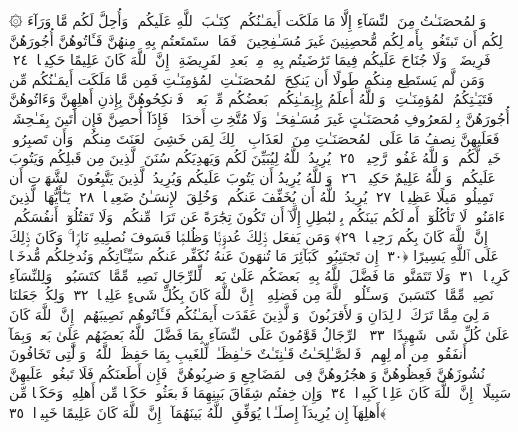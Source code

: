  ۞ وَٱلمُحصَنَـٰتُ مِنَ ٱلنِّسَآءِ إِلَّا مَا مَلَكَت أَيمَـٰنُكُم ۖ كِتَـٰبَ ٱللَّهِ عَلَيكُم ۚ وَأُحِلَّ لَكُم مَّا وَرَآءَ ذَٟلِكُم أَن تَبتَغُوا۟ بِأَموَٟلِكُم مُّحصِنِينَ غَيرَ مُسَـٰفِحِينَ ۚ فَمَا ٱستَمتَعتُم بِهِۦ مِنهُنَّ فَـَٔاتُوهُنَّ أُجُورَهُنَّ فَرِيضَةًۭ ۚ وَلَا جُنَاحَ عَلَيكُم فِيمَا تَرَٰضَيتُم بِهِۦ مِنۢ بَعدِ ٱلفَرِيضَةِ ۚ إِنَّ ٱللَّهَ كَانَ عَلِيمًا حَكِيمًۭا ﴿٢٤﴾
 وَمَن لَّم يَستَطِع مِنكُم طَولًا أَن يَنكِحَ ٱلمُحصَنَـٰتِ ٱلمُؤمِنَـٰتِ فَمِن مَّا مَلَكَت أَيمَـٰنُكُم مِّن فَتَيَـٰتِكُمُ ٱلمُؤمِنَـٰتِ ۚ وَٱللَّهُ أَعلَمُ بِإِيمَـٰنِكُم ۚ بَعضُكُم مِّنۢ بَعضٍۢ ۚ فَٱنكِحُوهُنَّ بِإِذنِ أَهلِهِنَّ وَءَاتُوهُنَّ أُجُورَهُنَّ بِٱلمَعرُوفِ مُحصَنَـٰتٍ غَيرَ مُسَـٰفِحَـٰتٍۢ وَلَا مُتَّخِذَٟتِ أَخدَانٍۢ ۚ فَإِذَآ أُحصِنَّ فَإِن أَتَينَ بِفَـٰحِشَةٍۢ فَعَلَيهِنَّ نِصفُ مَا عَلَى ٱلمُحصَنَـٰتِ مِنَ ٱلعَذَابِ ۚ ذَٟلِكَ لِمَن خَشِىَ ٱلعَنَتَ مِنكُم ۚ وَأَن تَصبِرُوا۟ خَيرٌۭ لَّكُم ۗ وَٱللَّهُ غَفُورٌۭ رَّحِيمٌۭ ﴿٢٥﴾
 يُرِيدُ ٱللَّهُ لِيُبَيِّنَ لَكُم وَيَهدِيَكُم سُنَنَ ٱلَّذِينَ مِن قَبلِكُم وَيَتُوبَ عَلَيكُم ۗ وَٱللَّهُ عَلِيمٌ حَكِيمٌۭ ﴿٢٦﴾
 وَٱللَّهُ يُرِيدُ أَن يَتُوبَ عَلَيكُم وَيُرِيدُ ٱلَّذِينَ يَتَّبِعُونَ ٱلشَّهَوَٟتِ أَن تَمِيلُوا۟ مَيلًا عَظِيمًۭا ﴿٢٧﴾
 يُرِيدُ ٱللَّهُ أَن يُخَفِّفَ عَنكُم ۚ وَخُلِقَ ٱلإِنسَـٰنُ ضَعِيفًۭا ﴿٢٨﴾
 يَـٰٓأَيُّهَا ٱلَّذِينَ ءَامَنُوا۟ لَا تَأكُلُوٓا۟ أَموَٟلَكُم بَينَكُم بِٱلبَٰطِلِ إِلَّآ أَن تَكُونَ تِجَٰرَةً عَن تَرَاضٍۢ مِّنكُم ۚ وَلَا تَقتُلُوٓا۟ أَنفُسَكُم ۚ إِنَّ ٱللَّهَ كَانَ بِكُم رَحِيمًۭا ﴿٢٩﴾
 وَمَن يَفعَل ذَٟلِكَ عُدوَٟنًۭا وَظُلمًۭا فَسَوفَ نُصلِيهِ نَارًۭا ۚ وَكَانَ ذَٟلِكَ عَلَى ٱللَّهِ يَسِيرًا ﴿٣٠﴾
 إِن تَجتَنِبُوا۟ كَبَآئِرَ مَا تُنهَونَ عَنهُ نُكَفِّر عَنكُم سَيِّـَٔاتِكُم وَنُدخِلكُم مُّدخَلًۭا كَرِيمًۭا ﴿٣١﴾
 وَلَا تَتَمَنَّوا۟ مَا فَضَّلَ ٱللَّهُ بِهِۦ بَعضَكُم عَلَىٰ بَعضٍۢ ۚ لِّلرِّجَالِ نَصِيبٌۭ مِّمَّا ٱكتَسَبُوا۟ ۖ وَلِلنِّسَآءِ نَصِيبٌۭ مِّمَّا ٱكتَسَبنَ ۚ وَسـَٔلُوا۟ ٱللَّهَ مِن فَضلِهِۦٓ ۗ إِنَّ ٱللَّهَ كَانَ بِكُلِّ شَىءٍ عَلِيمًۭا ﴿٣٢﴾
 وَلِكُلٍّۢ جَعَلنَا مَوَٟلِىَ مِمَّا تَرَكَ ٱلوَٟلِدَانِ وَٱلأَقرَبُونَ ۚ وَٱلَّذِينَ عَقَدَت أَيمَـٰنُكُم فَـَٔاتُوهُم نَصِيبَهُم ۚ إِنَّ ٱللَّهَ كَانَ عَلَىٰ كُلِّ شَىءٍۢ شَهِيدًا ﴿٣٣﴾
 ٱلرِّجَالُ قَوَّٰمُونَ عَلَى ٱلنِّسَآءِ بِمَا فَضَّلَ ٱللَّهُ بَعضَهُم عَلَىٰ بَعضٍۢ وَبِمَآ أَنفَقُوا۟ مِن أَموَٟلِهِم ۚ فَٱلصَّـٰلِحَـٰتُ قَـٰنِتَـٰتٌ حَـٰفِظَـٰتٌۭ لِّلغَيبِ بِمَا حَفِظَ ٱللَّهُ ۚ وَٱلَّٰتِى تَخَافُونَ نُشُوزَهُنَّ فَعِظُوهُنَّ وَٱهجُرُوهُنَّ فِى ٱلمَضَاجِعِ وَٱضرِبُوهُنَّ ۖ فَإِن أَطَعنَكُم فَلَا تَبغُوا۟ عَلَيهِنَّ سَبِيلًا ۗ إِنَّ ٱللَّهَ كَانَ عَلِيًّۭا كَبِيرًۭا ﴿٣٤﴾
 وَإِن خِفتُم شِقَاقَ بَينِهِمَا فَٱبعَثُوا۟ حَكَمًۭا مِّن أَهلِهِۦ وَحَكَمًۭا مِّن أَهلِهَآ إِن يُرِيدَآ إِصلَـٰحًۭا يُوَفِّقِ ٱللَّهُ بَينَهُمَآ ۗ إِنَّ ٱللَّهَ كَانَ عَلِيمًا خَبِيرًۭا ﴿٣٥﴾
